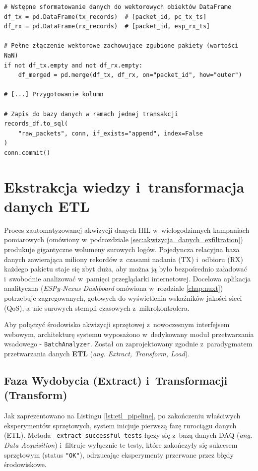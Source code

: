 \begin{listing}[htbp]
    \caption{Wykorzystanie silnika złączeń zewnętrznych (Outer Join) w~Pandas i~trwały zapis do bazy danych relacyjnych (\texttt{engine.py}) \cite{espy_nexus_python_host}.}
    \label{lst:python_acid_commit}
    \begin{verbatim}
# Wstępne sformatowanie danych do wektorowych obiektów DataFrame
df_tx = pd.DataFrame(tx_records)  # [packet_id, pc_tx_ts]
df_rx = pd.DataFrame(rx_records)  # [packet_id, esp_rx_ts]

# Pełne złączenie wektorowe zachowujące zgubione pakiety (wartości NaN)
if not df_tx.empty and not df_rx.empty:
    df_merged = pd.merge(df_tx, df_rx, on="packet_id", how="outer")

# [...] Przygotowanie kolumn

# Zapis do bazy danych w ramach jednej transakcji
records_df.to_sql(
    "raw_packets", conn, if_exists="append", index=False
)
conn.commit()
\end{verbatim}
\end{listing}

\section{Ekstrakcja wiedzy i~transformacja danych ETL}
\label{sec:batchanalyzer_etl}

Proces zautomatyzowanej akwizycji danych HIL w~wielogodzinnych kampaniach pomiarowych (omówiony w~podrozdziale \ref{sec:akwizycja_danych_exfiltration}) produkuje gigantyczne wolumeny surowych logów.
Pojedyncza relacyjna baza danych zawierająca miliony rekordów z~czasami nadania (TX) i~odbioru (RX) każdego pakietu staje się zbyt duża, aby można ją było bezpośrednio załadować i~swobodnie analizować w~pamięci przeglądarki internetowej.
Docelowa aplikacja analityczna (\textit{ESPy-Nexus Dashboard} omówiona w~rozdziale \ref{chap:nuxt}) potrzebuje zagregowanych, gotowych do wyświetlenia wskaźników jakości sieci (QoS), a~nie surowych stempli czasowych z~mikrokontrolera.

Aby połączyć środowisko akwizycji sprzętowej z~nowoczesnym interfejsem webowym, architekturę systemu wyposażono w~dedykowany moduł przetwarzania wsadowego - \texttt{BatchAnalyzer}.
Został on zaprojektowany zgodnie z~paradygmatem przetwarzania danych \textbf{ETL} (\textit{ang. Extract, Transform, Load}).

\subsection{Faza Wydobycia (Extract) i~Transformacji (Transform)}
Jak zaprezentowano na Listingu \ref{lst:etl_pipeline}, po zakończeniu właściwych eksperymentów sprzętowych, system inicjuje pierwszą fazę rurociągu danych (ETL).
Metoda \texttt{\_extract\_successful\_tests} łączy się z~bazą danych DAQ (\textit{ang. Data Acquisition}) i~filtruje wyłącznie te testy, które zakończyły się sukcesem sprzętowym (status \texttt{"OK"}), odrzucając eksperymenty przerwane przez błędy środowiskowe.

